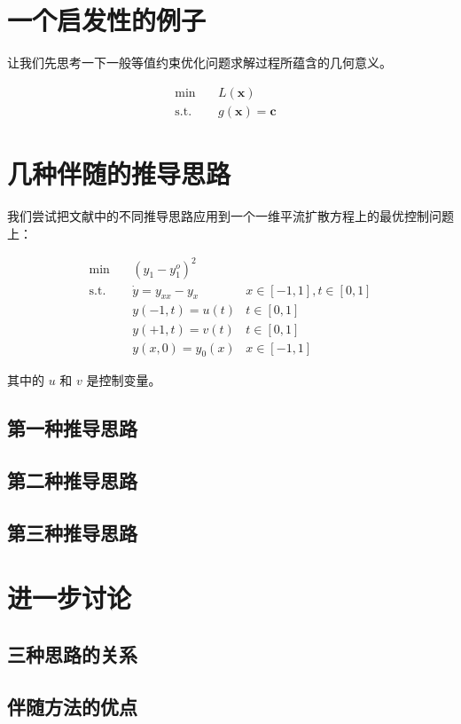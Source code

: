 \documentclass[a4paper,12pt]{article}
\begin{document}
\section{一个启发性的例子}

让我们先思考一下一般等值约束优化问题求解过程所蕴含的几何意义。

$$
\begin{array}{rcll}
\min &~& L(\mathbf{x}) & \\
\mathrm{s.t.} &~& g(\mathbf{x}) = \mathbf{c}
\end{array}
$$



\section{几种伴随的推导思路}

我们尝试把文献中的不同推导思路应用到一个一维平流扩散方程上的最优控制问题上：

$$
\begin{array}{rcll}
\min &~& (y_1 - y_1^o)^2 & \\
\mathrm{s.t.} &~& \dot{y} = y_{xx} - y_x & x \in [-1, 1], t \in [0, 1]\\
&~& y(-1, t) = u(t) & t \in [0, 1]\\
&~& y(+1, t) = v(t) & t \in [0, 1]\\
&~& y(x, 0) = y_0(x) & x \in [-1, 1]
\end{array}
$$

其中的 $ u $ 和 $ v $ 是控制变量。

\subsection{第一种推导思路}

\subsection{第二种推导思路}

\subsection{第三种推导思路}

\section{进一步讨论}

\subsection{三种思路的关系}

\subsection{伴随方法的优点}
\end{document}
